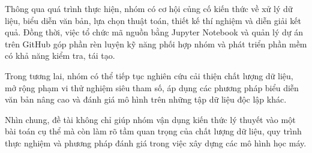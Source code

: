 Thông qua quá trình thực hiện, nhóm có
cơ hội củng cố kiến thức về xử lý dữ liệu,
biểu diễn văn bản, lựa chọn thuật toán,
thiết kế thí nghiệm và diễn giải kết quả.
Đồng thời, việc tổ chức mã nguồn bằng
Jupyter Notebook và quản lý dự án trên
GitHub góp phần rèn luyện kỹ năng phối hợp
nhóm và phát triển phần mềm có khả năng
kiểm tra, tái tạo.

Trong tương lai, nhóm có thể tiếp tục
nghiên cứu cải thiện chất lượng dữ liệu,
mở rộng phạm vi thử nghiệm siêu tham số,
áp dụng các phương pháp biểu diễn văn bản
nâng cao và đánh giá mô hình trên những
tập dữ liệu độc lập khác.

Nhìn chung, đề tài không chỉ giúp nhóm
vận dụng kiến thức lý thuyết vào một
bài toán cụ thể mà còn làm rõ tầm quan
trọng của chất lượng dữ liệu, quy trình
thực nghiệm và phương pháp đánh giá
trong việc xây dựng các mô hình học máy.
